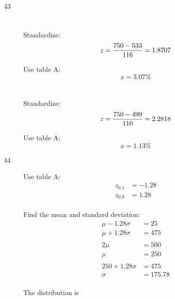 \documentclass[letterpaper, landscape]{exam}
\begin{document}
\begin{description}
      \item[43]
        \begin{parts}
          \part{}
            Standardize:
            \[
              z = \frac{750 - 533}{116} = 1.8707 \\
            \]

            Use table A:\@
            \[
              x = \boxed{ 3.07 \% }
            \]

          \part{}
            Standardize:
            \[
              z = \frac{750 - 499}{110} = 2.2818 \\
            \]

            Use table A:\@
            \[
              x = \boxed{ 1.13 \% }
            \]

        \end{parts}

      \item[44]
        Use table A:\@
        \begin{align*}
          z_{0.1} &= -1.28 \\
          z_{0.9} &= 1.28 \\
        \end{align*}

        Find the mean and standard deviation:
        \begin{align*}
          \mu - 1.28 \sigma &= 25 \\
          \mu + 1.28 \sigma &= 475 \\
          \\
          2 \mu & = 500 \\
          \mu   & = 250 \\
          \\
          250 + 1.28 \sigma & = 475 \\
          \sigma            & = 175.78 \\
        \end{align*}

        The distribution is 


\end{description}
\end{document}
